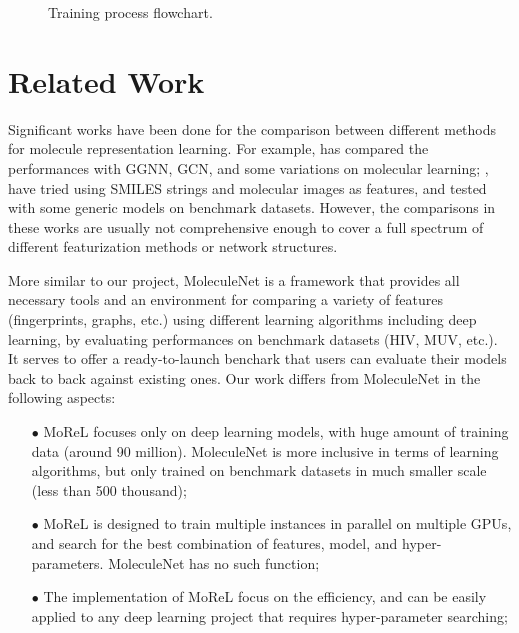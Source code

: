 \documentclass[conference]{IEEEtran}
\begin{document}
\begin{figure}[!htb] 

	\caption{\small 
		Training process flowchart. }
	\label{fig:train}
\end{figure}

\section{Related Work} \label{sec_rw}

Significant works have been done for the comparison between different methods for molecule representation learning. 
For example, \cite{gagcn} has compared the performances with GGNN, GCN, and some variations on molecular learning; \cite{smiles2vec}, \cite{chemception} have tried using SMILES strings and molecular images as features, and tested with some generic models on benchmark datasets. 
However, the comparisons in these works are usually not comprehensive enough to cover a full spectrum of different featurization methods or network structures. 

More similar to our project, MoleculeNet \cite{molnet} is a framework that provides all necessary tools and an environment for comparing a variety of features (fingerprints, graphs, etc.) using different learning algorithms including deep learning, by evaluating performances on benchmark datasets (HIV, MUV, etc.). 
It serves to offer a ready-to-launch benchark that users can evaluate their models back to back against existing ones. 
Our work differs from MoleculeNet in the following aspects:
\begin{itemize}
	\item[$\bullet$]  MoReL focuses only on deep learning models, with huge amount of training data (around 90 million). MoleculeNet is more inclusive in terms of learning algorithms, but only trained on benchmark datasets in much smaller scale (less than 500 thousand);
	\item[$\bullet$]  MoReL is designed to train multiple instances in parallel on multiple GPUs, and search for the best combination of features, model, and hyper-parameters. MoleculeNet has no such function;
	\item[$\bullet$]  The implementation of MoReL focus on the efficiency, and can be easily applied to any deep learning project that requires hyper-parameter searching; 
\end{itemize}
\end{document}
